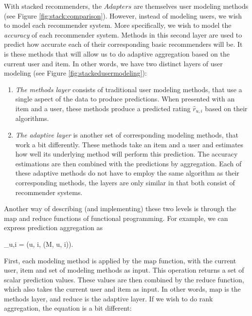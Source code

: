 With stacked recommenders, the $Adapters$ are themselves user modeling methods 
(see Figure \ref{fig:stack:comparison}).
However, instead of modeling users, we wish to model each recommender system.
More specifically, we wish to model the \emph{accuracy} of each recommender system.
Methods in this second layer are used to predict how accurate each of their corresponding basic recommenders will be.
It is these methods that will allow us to do adaptive aggregation based on the current user and item.
In other words, we have two distinct layers of user modeling 
(see Figure \ref{fig:stackedusermodeling}):



\begin{enumerate}
  \item
    \emph{The methods layer} consists of traditional user modeling methods, that use a single aspect of the data to produce predictions.
    When presented with an item and a user, these methods produce a predicted rating $\hat{r}_{u,i}$ based on their algorithms.
  \item
    \emph{The adaptive layer} is another set of corresponding modeling methods, that work a bit differently.
    These methods take an item and a user and estimates how well its underlying method will perform this prediction.
    The accuracy estimations are then combined with the predictions by aggregation.
    Each of these adaptive methods do not have to employ the same algorithm as their corresponding methods,
    the layers are only similar in that both consist of recommender systems.
\end{enumerate}

Another way of describing (and implementing) these two levels is through 
the $\mathrm{map}$ and $\mathrm{reduce}$ functions of functional programming.
For example, we can express prediction aggregation as 

\begin{eqsp}
  _{u,i} = (u, i, (M, u, i)).
\end{eqsp}
%
First, each modeling method is applied by the $\mathrm{map}$ function, with the current user, item and set of modeling methods as input.
This operation returns a set of scalar prediction values. 
These values are then combined by the $\mathrm{reduce}$ function, which also takes the current user and item as input.
In other words, $\mathrm{map}$ is the methods layer, and $\mathrm{reduce}$ is the adaptive layer.
If we wish to do rank aggregation, the equation is a bit different:

